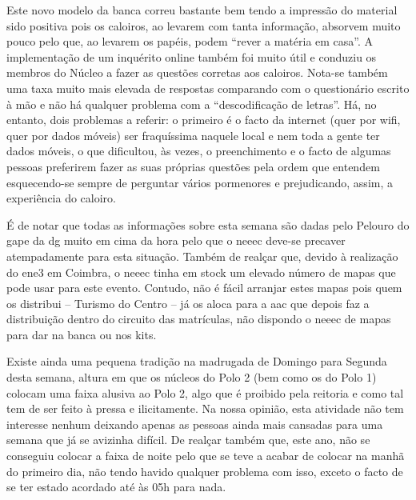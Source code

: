 Este novo modelo da banca correu bastante bem tendo a impressão do material sido positiva pois os caloiros, ao levarem com tanta informação, absorvem muito pouco pelo que, ao levarem os papéis, podem “rever a matéria em casa”. A implementação de um inquérito online também foi muito útil e conduziu os membros do Núcleo a fazer as questões corretas aos caloiros. Nota-se também uma taxa muito mais elevada de respostas comparando com o questionário escrito à mão e não há qualquer problema com a “descodificação de letras”. Há, no entanto, dois problemas a referir: o primeiro é o facto da internet (quer por wifi, quer por dados móveis) ser fraquíssima naquele local e nem toda a gente ter dados móveis, o que dificultou, às vezes, o preenchimento e o facto de algumas pessoas preferirem fazer as suas próprias questões pela ordem que entendem esquecendo-se sempre de perguntar vários pormenores e prejudicando, assim, a experiência do caloiro.

É de notar que todas as informações sobre esta semana são dadas pelo Pelouro do \acrshort{gape} da \acrshort{dg} muito em cima da hora pelo que o \acrshort{neeec} deve-se precaver atempadamente para esta situação. Também de realçar que, devido à realização do \acrshort{ene3} em Coimbra, o \acrshort{neeec} tinha em stock um elevado número de mapas que pode usar para este evento. Contudo, não é fácil arranjar estes mapas pois quem os distribui – Turismo do Centro – já os aloca para a \acrshort{aac} que depois faz a distribuição dentro do circuito das matrículas, não dispondo o \acrshort{neeec} de mapas para dar na banca ou nos kits.

{ %
Existe ainda uma pequena tradição na madrugada de Domingo para Segunda desta semana, altura em que os núcleos do Polo 2 (bem como os do Polo 1) colocam uma faixa alusiva ao Polo 2, algo que é proibido pela reitoria e como tal tem de ser feito à pressa e ilicitamente. Na nossa opinião, esta atividade não tem interesse nenhum deixando apenas as pessoas ainda mais cansadas para uma semana que já se avizinha difícil. De realçar também que, este ano, não se conseguiu colocar a faixa de noite pelo que se teve a acabar de colocar na manhã do primeiro dia, não tendo havido qualquer problema com isso, exceto o facto de se ter estado acordado até às 05h para nada.
}
{ %
}